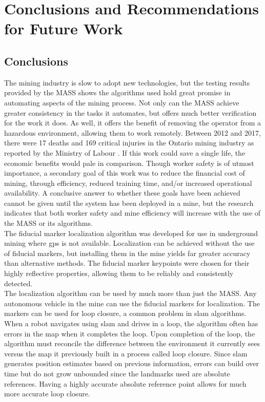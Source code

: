 \chapter{Conclusions and Recommendations for Future Work}
\label{chap:conclusions}
\section{Conclusions}
The mining industry is slow to adopt new technologies, but the testing results provided by the MASS shows the algorithms used hold great promise in automating aspects of the mining process. Not only can the MASS achieve greater consistency in the tasks it automates, but offers much better verification for the work it does. As well, it offers the benefit of removing the operator from a hazardous environment, allowing them to work remotely. Between 2012 and 2017, there were 17 deaths and 169 critical injuries in the Ontario mining industry as reported by the Ministry of Labour \cite{seebelow}. If this work could save a single life, the economic benefits would pale in comparison. Though worker safety is of utmost importance, a secondary goal of this work was to reduce the financial cost of mining, through efficiency, reduced training time, and/or increased operational availability. A conclusive answer to whether these goals have been achieved cannot be given until the system has been deployed in a mine, but the research indicates that both worker safety and mine efficiency will increase with the use of the MASS or its algorithms.\\

The fiducial marker localization algorithm was developed for use in underground mining where \acrshort{gps} is not available. Localization can be achieved without the use of fiducial markers, but installing them in the mine yields far greater accuracy than alternative methods. The fiducial marker keypoints were chosen for their highly reflective properties, allowing them to be reliably and consistently detected.\\

The localization algorithm can be used by much more than just the MASS. Any autonomous vehicle in the mine can use the fiducial markers for localization. The markers can be used for loop closure, a common problem in \acrshort{slam} algorithms. When a robot navigates using \acrshort{slam} and drives in a loop, the algorithm often has errors in the map when it completes the loop. Upon completion of the loop, the algorithm must reconcile the difference between the environment it currently sees versus the map it previously built in a process called loop closure. Since \acrshort{slam} generates position estimates based on previous information, errors can build over time but do not grow unbounded since the landmarks used are absolute references. Having a highly accurate absolute reference point allows for much more accurate loop closure.\\

